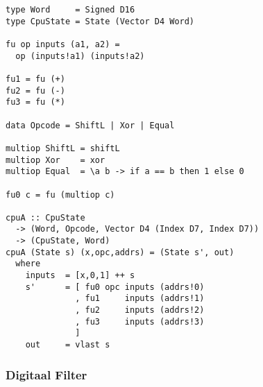 \documentclass{paper}
\begin{document}
\begin{lstlisting}[label=Simple_CPU,caption=Simple CPU,float=t]
type Word     = Signed D16
type CpuState = State (Vector D4 Word)

fu op inputs (a1, a2) =
  op (inputs!a1) (inputs!a2)

fu1 = fu (+)
fu2 = fu (-)
fu3 = fu (*)

data Opcode = ShiftL | Xor | Equal

multiop ShiftL = shiftL
multiop Xor    = xor
multiop Equal  = \a b -> if a == b then 1 else 0

fu0 c = fu (multiop c)

cpuA :: CpuState
  -> (Word, Opcode, Vector D4 (Index D7, Index D7))
  -> (CpuState, Word)
cpuA (State s) (x,opc,addrs) = (State s', out)
  where
    inputs  = [x,0,1] ++ s
    s'      = [ fu0 opc inputs (addrs!0)
              , fu1     inputs (addrs!1)
              , fu2     inputs (addrs!2)
              , fu3     inputs (addrs!3)
              ]
    out     = vlast s
\end{lstlisting}

\subsubsection*{Digitaal Filter} %
\label{ssub:digitaal_filter}

\end{document}
